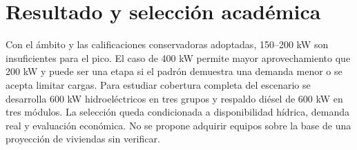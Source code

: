 \section{Resultado y selección académica}
Con el ámbito y las calificaciones conservadoras adoptadas, 150--200 kW son insuficientes para el pico. El caso de 400 kW permite mayor aprovechamiento que 200 kW y puede ser una etapa si el padrón demuestra una demanda menor o se acepta limitar cargas. Para estudiar cobertura completa del escenario se desarrolla 600 kW hidroeléctricos en tres grupos y respaldo diésel de 600 kW en tres módulos. La selección queda condicionada a disponibilidad hídrica, demanda real y evaluación económica. No se propone adquirir equipos sobre la base de una proyección de viviendas sin verificar.
